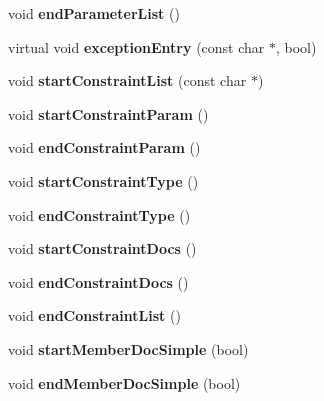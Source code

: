 \begin{DoxyCompactItemize}
void {\bfseries end\+Parameter\+List} ()
\item 
\mbox{\label{class_html_generator_a74f27361593c1219f23c3b9f0cb49e66}} 
virtual void {\bfseries exception\+Entry} (const char $\ast$, bool)
\item 
\mbox{\label{class_html_generator_aa5851d60541e79c0a0539e7206d85803}} 
void {\bfseries start\+Constraint\+List} (const char $\ast$)
\item 
\mbox{\label{class_html_generator_aac02dbee22fe7d3ff29081b4833981aa}} 
void {\bfseries start\+Constraint\+Param} ()
\item 
\mbox{\label{class_html_generator_ae0379d1142e0189d0f4a1d236b76501c}} 
void {\bfseries end\+Constraint\+Param} ()
\item 
\mbox{\label{class_html_generator_a6fefa778c71da8dc9bd4a28461a1da52}} 
void {\bfseries start\+Constraint\+Type} ()
\item 
\mbox{\label{class_html_generator_af424c10d553610d4a099e533632db5a8}} 
void {\bfseries end\+Constraint\+Type} ()
\item 
\mbox{\label{class_html_generator_a5ec6842686db43cbb2eb75eaef551472}} 
void {\bfseries start\+Constraint\+Docs} ()
\item 
\mbox{\label{class_html_generator_a5bd3b6d393908c6fd052f52658df64bf}} 
void {\bfseries end\+Constraint\+Docs} ()
\item 
\mbox{\label{class_html_generator_aaa12c82f9806096e567f4441e89b4fbc}} 
void {\bfseries end\+Constraint\+List} ()
\item 
\mbox{\label{class_html_generator_a11225f1d448b055ba7f5a5c4eb9c4415}} 
void {\bfseries start\+Member\+Doc\+Simple} (bool)
\item 
\mbox{\label{class_html_generator_a87353b6f2da0c0ec144148771360a0e4}} 
void {\bfseries end\+Member\+Doc\+Simple} (bool)

\end{DoxyCompactItemize}
